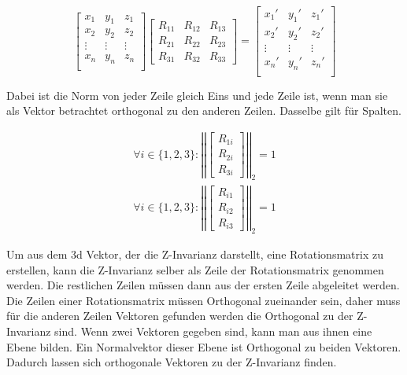 \begin{equation}
    \begin{bmatrix}  
    x_1 & y_1 & z_1 \\  
    x_2 & y_2 & z_2 \\  
    \vdots & \vdots & \vdots \\  
    x_n & y_n & z_n \\  
    \end{bmatrix}
    \begin{bmatrix}  
    R_{11} & R_{12} & R_{13} \\  
    R_{21} & R_{22} & R_{23} \\  
    R_{31} & R_{32} & R_{33}
    \end{bmatrix}  
    =
    \begin{bmatrix}  
    x_1' & y_1' & z_1' \\  
    x_2' & y_2' & z_2' \\  
    \vdots & \vdots & \vdots \\  
    x_n' & y_n' & z_n' \\  
    \end{bmatrix} 
\end{equation}

Dabei ist die Norm von jeder Zeile gleich Eins und jede Zeile ist, wenn man sie als Vektor betrachtet orthogonal zu den anderen Zeilen. Dasselbe gilt für Spalten.

\begin{align}
    \forall i \in \{1 , 2, 3 \}: \left|  \left| \begin{bmatrix} R_{1i} \\ R_{2i} \\ R_{3i} \end{bmatrix} \right| \right|_{2} = 1 \\
    \forall i \in \{1 , 2, 3 \}: \left|  \left| \begin{bmatrix} R_{i1} \\ R_{i2} \\ R_{i3} \end{bmatrix} \right| \right|_{2} = 1
\end{align}

Um aus dem 3d Vektor, der die Z-Invarianz darstellt, eine Rotationsmatrix zu erstellen, kann die Z-Invarianz selber als Zeile der Rotationsmatrix genommen werden. Die restlichen Zeilen müssen dann aus der ersten Zeile abgeleitet werden.
Die Zeilen einer Rotationsmatrix müssen Orthogonal zueinander sein, daher muss für die anderen Zeilen Vektoren gefunden werden die Orthogonal zu der Z-Invarianz sind. Wenn zwei Vektoren gegeben sind, kann man aus ihnen eine Ebene bilden.
Ein Normalvektor dieser Ebene ist Orthogonal zu beiden Vektoren. Dadurch lassen sich orthogonale Vektoren zu der Z-Invarianz finden.

